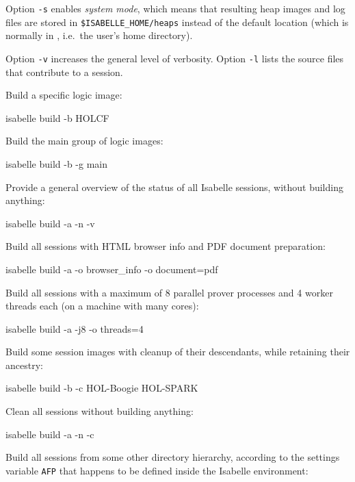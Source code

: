 \begin{isabellebody}
\begin{isamarkuptext}
  \medskip Option \verb|-s| enables \emph{system mode}, which
  means that resulting heap images and log files are stored in
  \verb|$ISABELLE_HOME/heaps| instead of the default location
  \hyperlink{setting.ISABELLE-OUTPUT}{\mbox{}} (which is normally in \hyperlink{setting.ISABELLE-HOME-USER}{\mbox{}}, i.e.\ the user's home directory).

  \medskip Option \verb|-v| increases the general level of
  verbosity.  Option \verb|-l| lists the source files that
  contribute to a session.%
\end{isamarkuptext}%
\isamarkuptrue%
%
\isamarkuptrue%
%
\begin{isamarkuptext}%
Build a specific logic image:
\begin{ttbox}
isabelle build -b HOLCF
\end{ttbox}

  \smallskip Build the main group of logic images:
\begin{ttbox}
isabelle build -b -g main
\end{ttbox}

  \smallskip Provide a general overview of the status of all Isabelle
  sessions, without building anything:
\begin{ttbox}
isabelle build -a -n -v
\end{ttbox}

  \smallskip Build all sessions with HTML browser info and PDF
  document preparation:
\begin{ttbox}
isabelle build -a -o browser_info -o document=pdf
\end{ttbox}

  \smallskip Build all sessions with a maximum of 8 parallel prover
  processes and 4 worker threads each (on a machine with many cores):
\begin{ttbox}
isabelle build -a -j8 -o threads=4
\end{ttbox}

  \smallskip Build some session images with cleanup of their
  descendants, while retaining their ancestry:
\begin{ttbox}
isabelle build -b -c HOL-Boogie HOL-SPARK
\end{ttbox}

  \smallskip Clean all sessions without building anything:
\begin{ttbox}
isabelle build -a -n -c
\end{ttbox}

  \smallskip Build all sessions from some other directory hierarchy,
  according to the settings variable \verb|AFP| that happens to
  be defined inside the Isabelle environment:
%
\end{isamarkuptext}%
\isamarkuptrue%
%
\isadelimtheory
%
\endisadelimtheory
%
\isatagtheory
{}\isamarkupfalse%
%
\endisatagtheory
{\isafoldtheory}%
%
\isadelimtheory
%
\endisadelimtheory
\isanewline
\end{isabellebody}%
